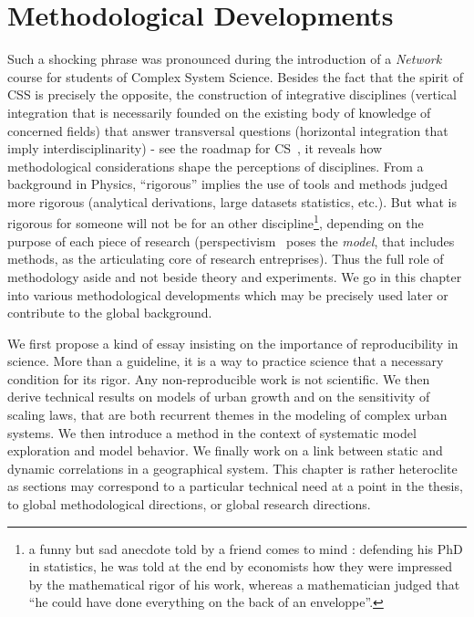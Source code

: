



\chapter{Methodological Developments} %

\label{ch:methodology} %




Such a shocking phrase was pronounced during the introduction of a \emph{Network} course for students of Complex System Science. Besides the fact that the spirit of CSS is precisely the opposite, \ie the construction of integrative disciplines (vertical integration that is necessarily founded on the existing body of knowledge of concerned fields) that answer transversal questions (horizontal integration that imply interdisciplinarity) - see \eg the roadmap for CS~\cite{2009arXiv0907.2221B}, it reveals how methodological considerations shape the perceptions of disciplines. From a background in Physics, ``rigorous'' implies the use of tools and methods judged more rigorous (analytical derivations, large datasets statistics, etc.). But what is rigorous for someone will not be for an other discipline\footnote{a funny but sad anecdote told by a friend comes to mind : defending his PhD in statistics, he was told at the end by economists how they were impressed by the mathematical rigor of his work, whereas a mathematician judged that ``he could have done everything on the back of an enveloppe''.}, depending on the purpose of each piece of research (perspectivism~\cite{giere2010scientific} poses the \emph{model}, that includes methods, as the articulating core of research entreprises). Thus the full role of methodology aside and not beside theory and experiments. We go in this chapter into various methodological developments which may be precisely used later or contribute to the global background.

We first propose a kind of essay insisting on the importance of reproducibility in science. More than a guideline, it is a way to practice science that a necessary condition for its rigor. Any non-reproducible work is not scientific. We then derive technical results on models of urban growth and on the sensitivity of scaling laws, that are both recurrent themes in the modeling of complex urban systems. We then introduce a method in the context of systematic model exploration and model behavior. We finally work on a link between static and dynamic correlations in a geographical system. This chapter is rather heteroclite as sections may correspond to a particular technical need at a point in the thesis, to global methodological directions, or global research directions.



